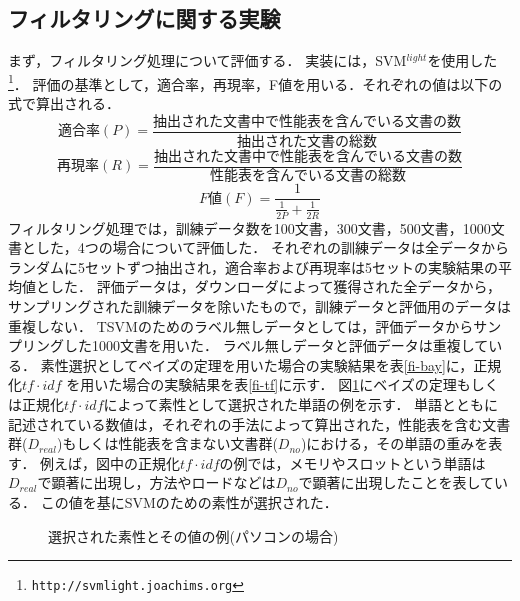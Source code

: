 \subsection{フィルタリングに関する実験}
まず，フィルタリング処理について評価する．
実装には，SVM$^{light}$を使用した\footnote{\verb+http://svmlight.joachims.org+}．
評価の基準として，適合率，再現率，F値を用いる．それぞれの値は以下の式で算出される．
\begin{equation}
適合率(P) = \frac{抽出された文書中で性能表を含んでいる文書の数}{抽出された文書の総数}
\end{equation}
\begin{equation}
再現率(R) = \frac{抽出された文書中で性能表を含んでいる文書の数}{性能表を含んでいる文書の総数}
\end{equation}\vspace*{-0.3cm}
\begin{equation}
F値(F) = \frac{1}{\frac{1}{2P}+\frac{1}{2R}}
\end{equation}
フィルタリング処理では，訓練データ数を100文書，300文書，500文書，1000文書とした，4つの場合について評価した．
それぞれの訓練データは全データからランダムに5セットずつ抽出され，適合率および再現率は5セットの実験結果の平均値とした．
評価データは，ダウンローダによって獲得された全データから，サンプリングされた訓練データを除いたもので，訓練データと評価用のデータは重複しない．
TSVMのためのラベル無しデータとしては，評価データからサンプリングした1000文書を用いた．
ラベル無しデータと評価データは重複している．
素性選択としてベイズの定理を用いた場合の実験結果を表\ref{fi-bay}に，正規化$tf \cdot idf$ を用いた場合の実験結果を表\ref{fi-tf}に示す．
図\ref{keys}にベイズの定理もしくは正規化$tf \cdot idf$によって素性として選択された単語の例を示す．
単語とともに記述されている数値は，それぞれの手法によって算出された，性能表を含む文書群($D_{real}$)もしくは性能表を含まない文書群($D_{no}$)における，その単語の重みを表す．
例えば，図中の正規化$tf \cdot idf$の例では，メモリやスロットという単語は$D_{real}$で顕著に出現し，方法やロードなどは$D_{no}$で顕著に出現したことを表している．
この値を基にSVMのための素性が選択された．
\begin{figure}[!tb]
\begin{center}
\end{center}
\vspace{-3mm}
\caption{選択された素性とその値の例(パソコンの場合)}
\label{keys}
\end{figure}

